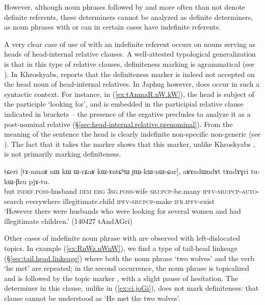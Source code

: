 However, although noun phrases followed by  and  more often than not denote definite referents, these determiners cannot be analyzed as definite determiners, as noun phrases with  or  can in certain cases have indefinite referents. 

A very clear case of use of  with an indefinite referent occurs on nouns serving as heads of head-internal relative clauses. A well-attested typological generalization is that in this type of relative clauses, definiteness marking is agrammatical (see \citealt{basilico96internally}). In Khroskyabs, \citet[636]{lai17khroskyabs} reports that the definiteness marker  is indeed not accepted on the head noun of head-internal relatives. In Japhug however,  does occur in such a syntactic context. For instance, in (\ref{ex:tAnmaR.nW.kW}), the head  is subject of the participle  `looking for', and is embedded in the participial relative clause indicated in brackets -- the presence of the ergative  precludes to analyze it as a post-nominal relative (§\ref{sec:head-internal.relative.prenominal}). From the meaning of the sentence the head  is clearly indefinite non-specific non-generic  (see \citealt[286--291]{lehmann84relativsatz}). The fact that it takes the marker  shows that this marker, unlike Khroskyabs , is not primarily marking definiteness.

\begin{exe}
\ex \label{ex:tAnmaR.nW.kW}
 \gll tɕeri [tɤ-nmaʁ nɯ kɯ ɯ-rʑaʁ kɯ-ɤntɕʰɯ ɲɯ-kɯ-nɯ-ɕar], aʁɤndɯndɤt tɤndɤɣri tu-kɯ-βzu pjɤ-tu.  \\
but  \textsc{indef}.\textsc{poss}-husband \textsc{dem} \textsc{erg} \textsc{3sg}.\textsc{poss}-wife  \textsc{sbj}:\textsc{pcp}-be.many \textsc{ipfv}-\textsc{sbj}:\textsc{pcp}-\textsc{auto}-search everywhere  illegitimate.child  \textsc{ipfv}-\textsc{sbj}:\textsc{pcp}-make \textsc{ifr}.\textsc{ipfv}-exist \\
\glt `However there were husbands who were looking for several women and had illegitimate children.' (140427 tAndAGri) 
\end{exe}

Other cases of indefinite noun phrase with  are observed with left-dislocated topics. In example (\ref{ex:RnWz.nWnW}), we find a type of tail-head linkeage  (§\ref{sec:tail.head.linkeage}) where both the noun phrase  `two wolves' and the verb  `he met' are repeated; in the second occurrence, the noun phrase is topicalized and is followed by the topic marker , with a slight pause of hesitation. The determiner  in this clause, unlike  in (\ref{ex:ci.joGi}), does not mark definiteness: that clause cannot be understood as `He met the two wolves'.


